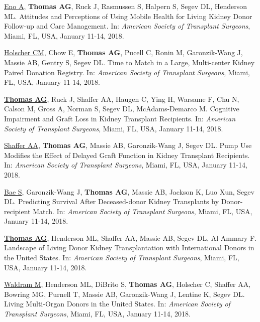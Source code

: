 \documentclass[10pt]{article}
\makeatletter
\newlength{\bibhang}
\newlength{\bibsep}
 {\@listi \global\bibsep\itemsep \global\advance\bibsep by\parsep}
\newenvironment{bibenum*}
  {\renewcommand\labelenumi{[\theenumi]}%
   \etaremune[
     topsep=0pt,
     itemsep=\bibsep,
     parsep=0pt,partopsep=0pt,
     itemindent=-\bibhang,
     leftmargin={\bibhang+\widthof{[999]}}]}
  {\endetaremune}
\makeatother
\begin{document}
\begin{bibenum*}
\item \underline{Eno A}, \textbf{Thomas AG}, Ruck J, Rasmussen S, Halpern S,
  Segev DL, Henderson ML. Attitudes and Perceptions of Using Mobile Health
  for Living Kidney Donor Follow-up and Care Management.
  In: \emph{American Society of Transplant Surgeons},
  Miami, FL, USA, January 11-14, 2018.

\item \underline{Holscher CM}, Chow E, \textbf{Thomas AG}, Pucell C, Ronin M,
  Garonzik-Wang J, Massie AB, Gentry S, Segev DL. Time to Match in a Large,
  Multi-center Kidney Paired Donation Registry.
  In: \emph{American Society of Transplant Surgeons},
  Miami, FL, USA, January 11-14, 2018.

\item \underline{\textbf{Thomas AG}}, Ruck J, Shaffer AA, Haugen C,
  Ying H, Warsame F, Chu N, Calson M, Gross A, Norman S, Segev DL,
  McAdams-Demarco M. Cognitive Impairment and Graft Loss in
  Kidney Transplant Recipients.
  In: \emph{American Society of Transplant Surgeons},
  Miami, FL, USA, January 11-14, 2018.

\item \underline{Shaffer AA}, \textbf{Thomas AG}, Massie AB,
  Garonzik-Wang J, Segev DL. Pump Use Modifies the Effect of Delayed
  Graft Function in Kidney Transplant Recipients.
  In: \emph{American Society of Transplant Surgeons},
  Miami, FL, USA, January 11-14, 2018.

\item \underline{Bae S}, Garonzik-Wang J, \textbf{Thomas AG}, Massie AB,
  Jackson K, Luo Xun, Segev DL.
  Predicting Survival After Deceased-donor Kidney Transplants by
  Donor-recipient Match.
  In: \emph{American Society of Transplant Surgeons},
  Miami, FL, USA, January 11-14, 2018.

\item \underline{\textbf{Thomas AG}}, Henderson ML, Shaffer AA,
  Massie AB, Segev DL, Al Ammary F. Landscape of Living Donor Kidney
  Transplantation with International Donors in the United States.
  In: \emph{American Society of Transplant Surgeons},
  Miami, FL, USA, January 11-14, 2018.

\item \underline{Waldram M}, Henderson ML, DiBrito S, \textbf{Thomas AG},
  Holscher C, Shaffer AA, Bowring MG, Purnell T, Massie AB,
  Garonzik-Wang J, Lentine K, Segev DL. Living Multi-Organ Donors in the
  United States.
  In: \emph{American Society of Transplant Surgeons},
  Miami, FL, USA, January 11-14, 2018.


\end{bibenum*}
\end{document}
